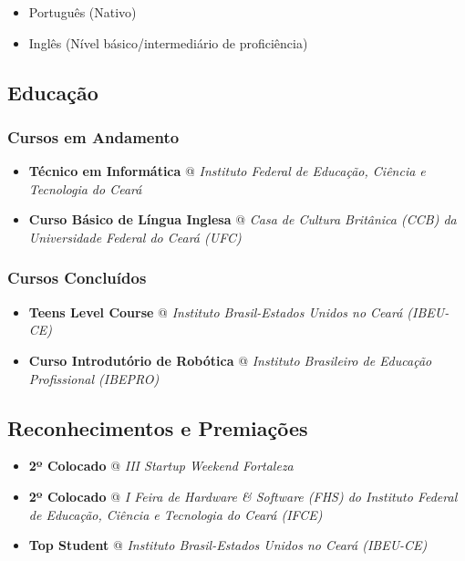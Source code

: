 \documentclass[]{article}
\begin{document}
\begin{itemize}
\item
  Português (Nativo)
\item
  Inglês (Nível básico/intermediário de proficiência)
\end{itemize}

\subsection{Educação}\label{educauxe7uxe3o}

\subsubsection{Cursos em Andamento}\label{cursos-em-andamento}

\begin{itemize}
\item
  \textbf{Técnico em Informática} @ \emph{Instituto Federal de Educação,
  Ciência e Tecnologia do Ceará}
\item
  \textbf{Curso Básico de Língua Inglesa} @ \emph{Casa de Cultura
  Britânica (CCB) da Universidade Federal do Ceará (UFC)}
\end{itemize}

\subsubsection{Cursos Concluídos}\label{cursos-concluuxeddos}

\begin{itemize}
\item
  \textbf{Teens Level Course} @ \emph{Instituto Brasil-Estados Unidos no
  Ceará (IBEU-CE)}
\item
  \textbf{Curso Introdutório de Robótica} @ \emph{Instituto Brasileiro
  de Educação Profissional (IBEPRO)}
\end{itemize}

\subsection{Reconhecimentos e
Premiações}\label{reconhecimentos-e-premiauxe7uxf5es}

\begin{itemize}
\item
  \textbf{2º Colocado} @ \emph{III Startup Weekend Fortaleza}
\item
  \textbf{2º Colocado} @ \emph{I Feira de Hardware \& Software (FHS) do
  Instituto Federal de Educação, Ciência e Tecnologia do Ceará (IFCE)}
\item
  \textbf{Top Student} @ \emph{Instituto Brasil-Estados Unidos no Ceará
  (IBEU-CE)}
\end{itemize}
\end{document}
